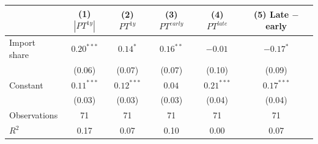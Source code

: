 \begin{tabular}{lccccc}
\toprule
 & (1) $|PT^{1y}|$ & (2) $PT^{1y}$ & (3) $PT^{early}$ & (4) $PT^{late}$ & (5) Late $-$ early \\
\midrule
Import share & $0.20^{***}$ & $0.14^{*}$ & $0.16^{**}$ & $-0.01^{}$ & $-0.17^{*}$ \\
 & (0.06) & (0.07) & (0.07) & (0.10) & (0.09) \\
Constant & $0.11^{***}$ & $0.12^{***}$ & $0.04^{}$ & $0.21^{***}$ & $0.17^{***}$ \\
 & (0.03) & (0.03) & (0.03) & (0.04) & (0.04) \\
Observations & 71 & 71 & 71 & 71 & 71 \\
$R^2$ & 0.17 & 0.07 & 0.10 & 0.00 & 0.07 \\
\bottomrule
\end{tabular}
